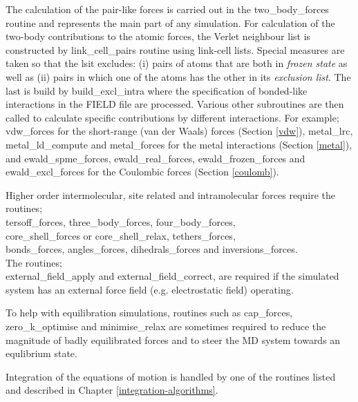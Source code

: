 The calculation of the pair-like forces is carried out in the
{\sc two\_body\_forces} routine and represents the main part of any
simulation.  For calculation of the two-body contributions to the
atomic forces, the Verlet neighbour list
is constructed by {\sc link\_cell\_pairs} routine using link-cell
lists.  Special measures are taken so that the lsit excludes: (i)
pairs of atoms that are both in {\em frozen state} as well as (ii)
pairs in which one of the atoms has the other in its
{\em exclusion list}.  The last is build by {\sc build\_excl\_intra}
where the specification of bonded-like interactions in the FIELD file
are processed.  Various other subroutines are then called to
calculate specific contributions by different interactions.  For example;
{\sc vdw\_forces} for the short-range (van der Waals)
forces (Section \ref{vdw}), {\sc metal\_lrc}, {\sc metal\_ld\_compute} and
{\sc metal\_forces} for the metal interactions 
(Section \ref{metal}), and {\sc ewald\_spme\_forces}, {\sc ewald\_real\_forces},
{\sc ewald\_frozen\_forces} and {\sc ewald\_excl\_forces} for the
Coulombic forces (Section \ref{coulomb}).

Higher order intermolecular, site
related and intramolecular forces
require the routines; \\
{\sc tersoff\_forces}, {\sc three\_body\_forces},
{\sc four\_body\_forces}, \\
{\sc core\_shell\_forces} or {\sc core\_shell\_relax},
{\sc tethers\_forces}, \\
{\sc bonds\_forces}, {\sc angles\_forces}, {\sc dihedrals\_forces}
and {\sc inversions\_forces}.  \\
The routines; \\
{\sc external\_field\_apply} and {\sc external\_field\_correct},
are required if the simulated system has an external force field
(e.g. electrostatic field) operating.

To help with equilibration simulations, routines such as
{\sc cap\_forces}, {\sc zero\_k\_optimise} and {\sc minimise\_relax}
are sometimes required to reduce the magnitude of badly
equilibrated forces and to steer the MD system towards an
equlibrium state.

Integration of the equations of motion is handled by one of the
routines listed and described in Chapter \ref{integration-algorithms}.

